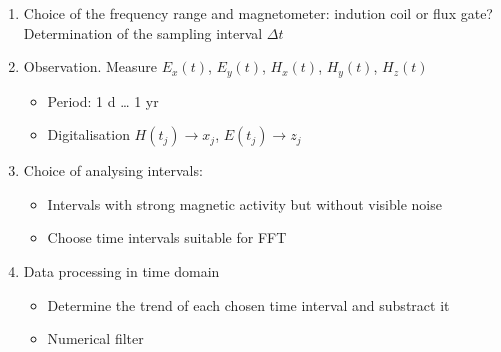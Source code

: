 \begin{enumerate}
\def\labelenumi{\arabic{enumi}.}
\item
  Choice of the frequency range and magnetometer: indution coil or flux
  gate? Determination of the sampling interval \(\Delta t\)
\item
  Observation. Measure \(E_x(t)\), \(E_y(t)\), \(H_x(t)\), \(H_y(t)\),
  \(H_z(t)\)

  \begin{itemize}
  \tightlist
  \item
    Period: 1 d \ldots{} 1 yr
  \item
    Digitalisation \(H(t_j) \to x_j\), \(E(t_j) \to z_j\)
  \end{itemize}
\item
  Choice of analysing intervals:

  \begin{itemize}
  \tightlist
  \item
    Intervals with strong magnetic activity but without visible noise
  \item
    Choose time intervals suitable for FFT
  \end{itemize}
\item
  Data processing in time domain

  \begin{itemize}
  \tightlist
  \item
    Determine the trend of each chosen time interval and substract it
  \item
    Numerical filter


\end{itemize}
\end{enumerate}
